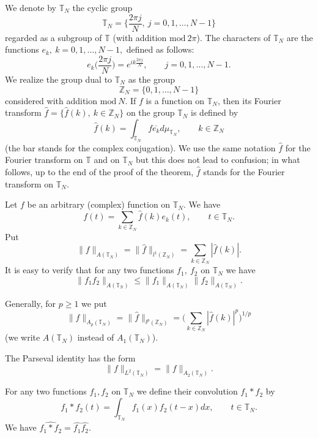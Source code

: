 \documentclass[12pt]{article}
\begin{document}
   We denote by $\mathbb T_N$ the cyclic group
$$
\mathbb T_N=\bigg\{\frac{2\pi j}{N}, ~j=0, 1, \ldots, N-1\bigg\}
$$
regarded as a subgroup of $\mathbb T$ (with addition
$\mathrm{mod}~2\pi$). The characters of $\mathbb T_N$ are the
functions $e_k, ~k=0, 1, \ldots, N-1,$ defined as follows:
$$
e_k\bigg(\frac{2\pi j}{N}\bigg)=e^{ik\frac{2\pi j}{N}},
\qquad j=0, 1, \ldots, N-1.
$$
We realize the group dual to $\mathbb T_N$ as the group
$$
\mathbb Z_N=\{0, 1, \ldots, N-1\}
$$
considered with addition $\mathrm{mod}~N$. If $f$ is a function on
$\mathbb T_N$, then its Fourier transform
$\widehat{f}=\{\widehat{f}(k), ~k\in\mathbb Z_N\}$ on the group
$\mathbb T_N$ is defined by
$$
\widehat{f}(k)=\int_{\mathbb T_N} f \overline{e_k} d\mu_{\mathbb T_N},
\qquad k\in\mathbb Z_N
$$
(the bar stands for the complex conjugation). We use the same
notation $\widehat{f}$ for the Fourier transform on $\mathbb T$
and on $\mathbb T_N$ but this does not lead to confusion; in what
follows, up to the end of the proof of the theorem, $\widehat{f}$
stands for the Fourier transform on $\mathbb T_N$.

  Let $f$ be an arbitrary (complex) function on
$\mathbb T_N$. We have
$$
f(t)=\sum_{k\in\mathbb Z_N}\widehat{f}(k)e_k(t),
\qquad t\in \mathbb T_N.
$$
Put
$$
\|f\|_{A(\mathbb T_N)}=\|\widehat{f}\|_{l^1(\mathbb Z_N)}=
\sum_{k\in\mathbb Z_N}|\widehat{f}(k)|.
$$
It is easy to verify that for any two functions $f_1, ~f_2$ on
$\mathbb T_N$ we have
$$
\|f_1f_2\|_{A(\mathbb
T_N)}\leq\|f_1\|_{A(\mathbb T_N)}\|f_2\|_{A(\mathbb T_N)}.
$$

   Generally, for $p\geq 1$ we put
$$
\|f\|_{A_p(\mathbb T_N)}=\|\widehat{f}\|_{l^p(\mathbb Z_N)}=
\bigg(\sum_{k\in\mathbb Z_N}|\widehat{f}(k)|^p\bigg)^{1/p}
$$
(we write $A(\mathbb T_N)$ instead of $A_1(\mathbb T_N)$).

  The Parseval identity has the form
$$
\|f\|_{L^2(\mathbb T_N)}=\|f\|_{A_2(\mathbb T_N)}.
$$

  For any two functions $f_1, f_2$ on $\mathbb T_N$ we
define their convolution $f_1\ast f_2$ by
$$
f_1\ast f_2 (t)=\int_{\mathbb T_N} f_1(x)f_2(t-x)dx,
\qquad t\in \mathbb T_N.
$$
We have $\widehat{f_1\ast f_2}=\widehat{f_1}\widehat{f_2}$.
\end{document}
